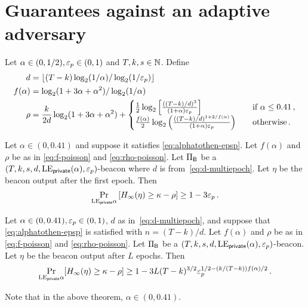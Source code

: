 \section{Guarantees against an adaptive adversary}

Let $\alpha \in (0, 1/2), \mathsf{\varepsilon}_p \in (0, 1)$ and $T, k, s \in \mathbb{N}$.
Define 
\begin{align}
    d &= \lfloor (T - k) \log_2(1/\alpha)/\log_2(1/\mathsf{\varepsilon}_p)\rfloor \label{eq:d-multiepoch}\\
    f(\alpha) &= \log_2(1 + 3 \alpha + \alpha^2)/\log_2(1/\alpha) \label{eq:f-poisson} \\
  \rho &= 
      \frac{k}{2 d} \log_2(1+3\alpha+\alpha^2) 
      + \begin{cases}
     \frac{1}{2} \log_2 \left[ \frac{((T-k)/d)^3}{(1+\alpha) \mathsf{\varepsilon}_p } \right] 
      & \quad\text{if $\alpha \leq 0.41$}\,, \\
     \frac{f(\alpha)}{2} \log_2 \left(\frac{((T-k)/d)^{1 + 2/f(\alpha)} }{(1+\alpha) \mathsf{\varepsilon}_p} \right) 
      &\quad\text{otherwise\,.}\label{eq:rho-poisson}
  \end{cases}
\end{align}


\begin{theorem}\label{thm:beacon-poisson-single-epoch}
  Let $\alpha \in (0, 0.41)$ and suppose it satisfies \eqref{eq:alphatothen-epsp}.
  Let $f(\alpha)$ and $\rho$ be as in \eqref{eq:f-poisson} and \eqref{eq:rho-poisson}.
  Let $\Pi_{\mathsf{B}}$ be a $(T,k,s,d,\mathrm{LE}_\mathsf{private}(\alpha), \mathsf{\varepsilon}_p)$-beacon 
  where $d$ is from~\eqref{eq:d-multiepoch}.
  Let $\eta$ be the beacon output after the first epoch. 
  Then 
  \begin{equation}\label{eq:security-bernoulli-single-epoch}
    \Pr_{\mathrm{LE}_\mathsf{private}{\alpha}}\left[H_\infty(\eta) \geq \kappa - \rho \right] \geq 1 - 3 \mathsf{\varepsilon}_p
    \,.
  \end{equation}
\end{theorem}



\begin{theorem}\label{thm:beacon-poisson-multi-epoch}
  Let $\alpha \in (0, 0.41), \mathsf{\varepsilon}_p \in (0,1)$, 
  $d$ as in~\eqref{eq:d-multiepoch}, 
  and suppose that \eqref{eq:alphatothen-epsp} is satisfied with $n = (T-k)/d$.
  Let $f(\alpha)$ and $\rho$ be as in \eqref{eq:f-poisson} and \eqref{eq:rho-poisson}.
  Let $\Pi_{\mathsf{B}}$ be a $(T,k,s,d,\mathrm{LE}_\mathsf{private}(\alpha), \mathsf{\varepsilon}_p)$-beacon.
  Let $\eta$ be the beacon output after $L$ epochs. 
  Then 
  $$
    \Pr_{\mathrm{LE}_\mathsf{private}{\alpha}}[H_\infty(\eta) \geq \kappa - \rho ] \geq 
      1 - 3 L (T - k)^{3/2} \mathsf{\varepsilon}_p^{1/2 - (k/(T-k)) f(\alpha)/2}
    \,.
  $$
\end{theorem}
\noindent
Note that in the above theorem, $\alpha \in (0, 0.41)$.
